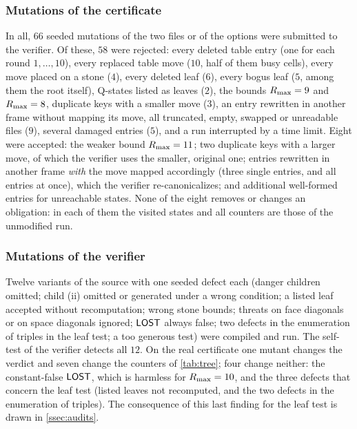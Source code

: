 \subsubsection*{Mutations of the certificate}
In all, $66$ seeded mutations of the two files or of the options were submitted to the verifier. Of
these, $58$ were rejected: every deleted table entry (one for each round $1,\dots,10$), every replaced table move ($10$, half
of them busy cells), every move placed on a stone ($4$), every deleted leaf ($6$), every bogus leaf ($5$,
among them the root itself), Q-states listed as leaves ($2$), the bounds $R_{\max}=9$ and $R_{\max}=8$,
duplicate keys with a smaller move ($3$), an entry rewritten in another frame without mapping its move, all
truncated, empty, swapped or unreadable files ($9$), several damaged entries ($5$), and a run interrupted
by a time limit. Eight were accepted: the weaker bound $R_{\max}=11$; two duplicate keys with a larger move, of which the verifier uses the smaller,
original one; entries rewritten in another frame \emph{with} the move mapped accordingly (three single
entries, and all entries at once), which the verifier re-canonicalizes; and additional well-formed entries for
unreachable states. None of the eight removes or changes an obligation: in each of them the visited
states and all counters are those of the unmodified run.

\subsubsection*{Mutations of the verifier}
Twelve variants of the source with one seeded defect each (danger children omitted; child (ii) omitted or
generated under a wrong condition; a listed leaf accepted without recomputation; wrong stone bounds;
threats on face diagonals or on space diagonals ignored; $\mathsf{LOST}$ always false; two defects in the
enumeration of triples in the leaf test; a too generous \VOID{} test) were compiled and run. The
self-test of the verifier detects all $12$. On the real certificate one mutant changes the verdict and seven change the
counters of \cref{tab:tree}; four change neither: the constant-false $\mathsf{LOST}$, which is harmless for
$R_{\max}=10$, and the three defects that concern the leaf test (listed leaves not recomputed, and the two
defects in the enumeration of triples). The consequence of this last finding for the leaf test is drawn
in \cref{ssec:audits}.

